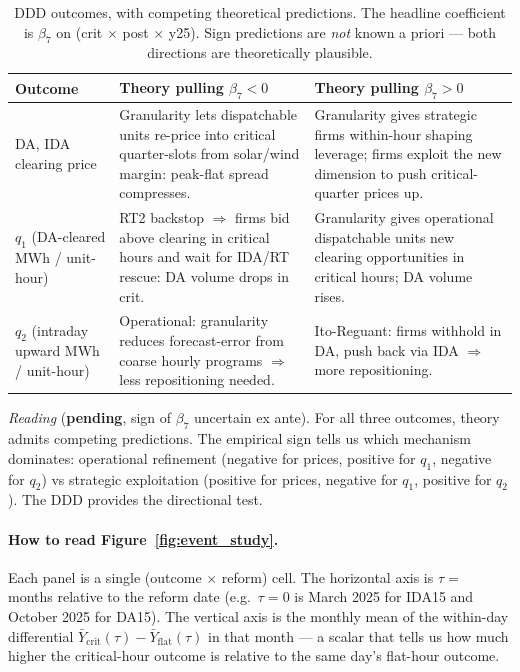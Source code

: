 \documentclass[11pt,a4paper]{article}
\begin{document}
\begin{table}[H]
\centering
\caption{DDD outcomes, with competing theoretical predictions. The headline coefficient is $\beta_7$ on (crit $\times$ post $\times$ y25). Sign predictions are \emph{not} known a priori — both directions are theoretically plausible.}
\label{tab:reform_outcomes}
\footnotesize
\setlength{\tabcolsep}{4pt}
\begin{tabular}{@{}p{2.4cm} p{6.0cm} p{6.5cm}@{}}
\toprule
Outcome & Theory pulling $\beta_7 < 0$ & Theory pulling $\beta_7 > 0$ \\
\midrule
DA, IDA clearing price & Granularity lets dispatchable units re-price into critical quarter-slots from solar/wind margin: peak-flat spread compresses. & Granularity gives strategic firms within-hour shaping leverage; firms exploit the new dimension to push critical-quarter prices up. \\
\addlinespace
$q_1$ (DA-cleared MWh / unit-hour) & RT2 backstop $\Rightarrow$ firms bid above clearing in critical hours and wait for IDA/RT rescue: DA volume drops in crit. & Granularity gives operational dispatchable units new clearing opportunities in critical hours; DA volume rises. \\
\addlinespace
$q_2$ (intraday upward MWh / unit-hour) & Operational: granularity reduces forecast-error from coarse hourly programs $\Rightarrow$ less repositioning needed. & Ito-Reguant: firms withhold in DA, push back via IDA $\Rightarrow$ more repositioning. \\
\bottomrule
\end{tabular}
\end{table}

\textit{Reading} (\textbf{pending}, sign of $\beta_7$ uncertain ex ante). For all three outcomes, theory admits competing predictions. The empirical sign tells us which mechanism dominates: operational refinement (negative for prices, positive for $q_1$, negative for $q_2$) vs strategic exploitation (positive for prices, negative for $q_1$, positive for $q_2$). The DDD provides the directional test.

\paragraph{How to read Figure~\ref{fig:event_study}.}
Each panel is a single (outcome $\times$ reform) cell. The horizontal axis is $\tau =$ months relative to the reform date (e.g.\ $\tau = 0$ is March 2025 for IDA15 and October 2025 for DA15). The vertical axis is the monthly mean of the within-day differential $\bar Y_{\text{crit}}(\tau) - \bar Y_{\text{flat}}(\tau)$ in that month --- a scalar that tells us how much higher the critical-hour outcome is relative to the same day's flat-hour outcome.
\end{document}
